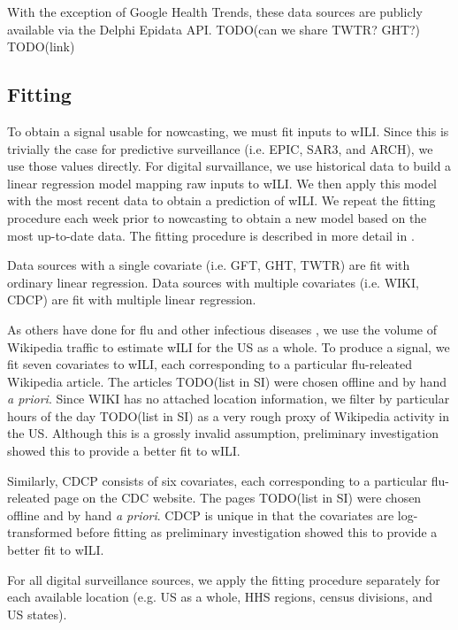 \documentclass[10pt,letterpaper]{article}
\begin{document}
With the exception of Google Health Trends, these data sources are publicly
available via the Delphi Epidata API. TODO(can we share TWTR? GHT?) TODO(link)

\subsection*{Fitting}

To obtain a signal usable for nowcasting, we must fit inputs to wILI. Since
this is trivially the case for predictive surveillance (i.e. EPIC, SAR3, and
ARCH), we use those values directly. For digital survaillance, we use
historical data to build a linear regression model mapping raw inputs to wILI.
We then apply this model with the most recent data to obtain a prediction of
wILI. We repeat the fitting procedure each week prior to nowcasting to obtain a
new model based on the most up-to-date data. The fitting procedure is described
in more detail in \cite{farrow2016modeling}.

Data sources with a single covariate (i.e. GFT, GHT, TWTR) are fit with
ordinary linear regression. Data sources with multiple covariates (i.e. WIKI,
CDCP) are fit with multiple linear regression.

As others have done for flu and other infectious diseases
\cite{generous2014global, hickmann2015forecasting, mciver2014wikipedia}, we use
the volume of Wikipedia traffic to estimate wILI for the US as a whole. To
produce a signal, we fit seven covariates to wILI, each corresponding to a
particular flu-releated Wikipedia article. The articles TODO(list in SI) were
chosen offline and by hand \textit{a priori}. Since WIKI has no attached
location information, we filter by particular hours of the day TODO(list in SI)
as a very rough proxy of Wikipedia activity in the US. Although this is a
grossly invalid assumption, preliminary investigation showed this to provide a
better fit to wILI.

Similarly, CDCP consists of six covariates, each corresponding to a particular
flu-releated page on the CDC website. The pages TODO(list in SI) were chosen
offline and by hand \textit{a priori}. CDCP is unique in that the covariates
are log-transformed before fitting as preliminary investigation showed this to
provide a better fit to wILI.

For all digital surveillance sources, we apply the fitting procedure separately
for each available location (e.g. US as a whole, HHS regions, census divisions,
and US states).
\end{document}
